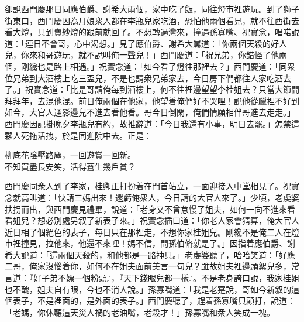 卻說西門慶那日同應伯爵、謝希大兩個，{}家中吃了飯，同往燈市裡遊玩。到了獅子街東口，西門慶因為月娘衆人都在李瓶兒家吃酒，恐怕他兩個看見，就不往西街去看大燈，只到賣紗燈的跟前就回了。不想轉過灣來，撞遇孫寡嘴、祝實念，唱喏說道：「連日不會哥，心中渴想。」見了應伯爵、謝希大罵道：「你兩個天殺的好人兒，你來和哥遊玩，就不說叫俺一聲兒！」西門慶道：「祝兄弟，你錯怪了他兩個，剛纔也是路上相遇。」祝實念道：「如今看了燈往那裡去？」西門慶道：「同衆位兄弟到大酒樓上吃三盃兒，不是也請衆兄弟家去，今日房下們都往人家吃酒去了。」祝實念道：「比是哥請俺每到酒樓上，何不往裡邊望望李桂姐去？只當大節間拜拜年，去混他混。前日俺兩個在他家，他望着俺們好不哭哩！說他從臘裡不好到如今，大官人通影邊兒不進去看他看。哥今日倒閑，俺們情願相伴哥進去走走。」西門慶因記掛晚夕李瓶兒有約，故推辭道：「今日我還有小事，明日去罷。」怎禁這夥人死拖活拽，於是同進院中去。正是：

\begin{myquote}
柳底花陰壓路塵，一回遊賞一回新。\\不知買盡長安笑，活得蒼生幾戶貧？
\end{myquote}

西門慶同衆人到了李家，桂卿正打扮着在門首站立，一面迎接入中堂相見了。祝實念就高叫道：{}「快請三媽出來！還虧俺衆人，今日請的大官人來了。」少頃，老虔婆扶拐而出，與西門慶見禮畢，說道：「老身又不曾怠慢了姐夫，如何一向不進來看看姐兒？想必別處另叙了新表子來。」祝實念插口道：「你老人家會猜算，俺大官人近日相了個絕色的表子，每日只在那裡走，不想你家桂姐兒。剛纔不是俺二人在燈市裡撞見，拉他來，他還不來哩！媽不信，問孫伯脩就是了。」因指着應伯爵、謝希大說道：「這兩個天殺的，和他都是一路神只。」老虔婆聽了，哈哈笑道：「好應二哥，俺家沒惱着你，如何不在姐夫面前美言一句兒？雖故姐夫裡邊頭絮兒多，常言道：『好子弟不嫖一個粉頭』，『天下錢眼兒都一樣』。{}不是老身誇口說，我家桂姐也不醜，姐夫自有眼，今也不消人說。」孫寡嘴道：「我是老寔說，哥如今新叙的這個表子，不是裡面的，是外面的表子。」{}西門慶聽了，趕着孫寡嘴只顧打，說道：「老媽，你休聽這天災人禍的老油嘴，老殺才！」孫寡嘴和衆人笑成一塊。

